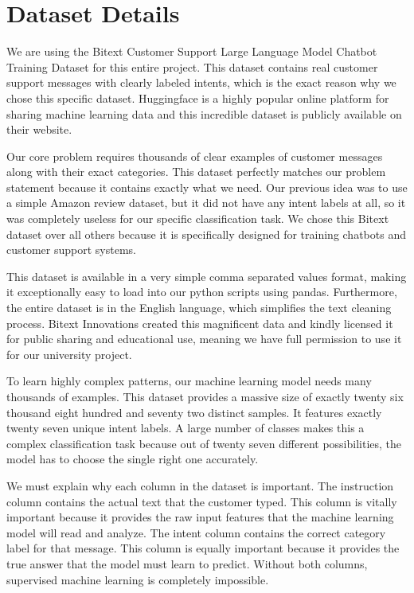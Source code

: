 \documentclass[12pt]{article}
\begin{document}
\section{Dataset Details}
We are using the Bitext Customer Support Large Language Model Chatbot Training Dataset for this entire project. This dataset contains real customer support messages with clearly labeled intents, which is the exact reason why we chose this specific dataset. Huggingface is a highly popular online platform for sharing machine learning data and this incredible dataset is publicly available on their website. 

Our core problem requires thousands of clear examples of customer messages along with their exact categories. This dataset perfectly matches our problem statement because it contains exactly what we need. Our previous idea was to use a simple Amazon review dataset, but it did not have any intent labels at all, so it was completely useless for our specific classification task. We chose this Bitext dataset over all others because it is specifically designed for training chatbots and customer support systems. 

This dataset is available in a very simple comma separated values format, making it exceptionally easy to load into our python scripts using pandas. Furthermore, the entire dataset is in the English language, which simplifies the text cleaning process. Bitext Innovations created this magnificent data and kindly licensed it for public sharing and educational use, meaning we have full permission to use it for our university project. 

To learn highly complex patterns, our machine learning model needs many thousands of examples. This dataset provides a massive size of exactly twenty six thousand eight hundred and seventy two distinct samples. It features exactly twenty seven unique intent labels. A large number of classes makes this a complex classification task because out of twenty seven different possibilities, the model has to choose the single right one accurately. 

We must explain why each column in the dataset is important. The instruction column contains the actual text that the customer typed. This column is vitally important because it provides the raw input features that the machine learning model will read and analyze. The intent column contains the correct category label for that message. This column is equally important because it provides the true answer that the model must learn to predict. Without both columns, supervised machine learning is completely impossible. 
\end{document}
